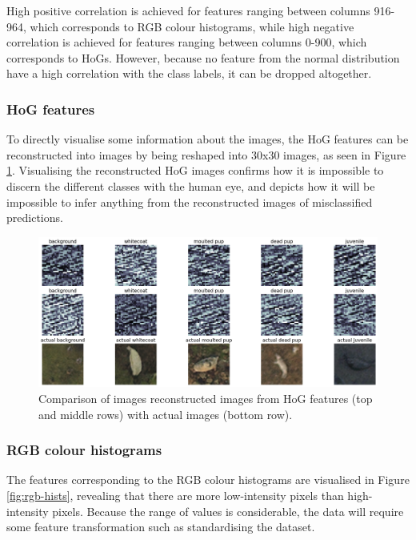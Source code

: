 \documentclass[letterpaper,12pt]{article}
\begin{document}
High positive correlation is achieved for features ranging between columns 916-964, which corresponds to RGB colour histograms, while high negative correlation is achieved for features ranging between columns 0-900, which corresponds to HoGs. However, because no feature from the normal distribution have a high correlation  with the class labels, it can be dropped altogether.

\subsubsection{HoG features}

To directly visualise some information about the images, the HoG features can be reconstructed into images by being reshaped into 30x30 images, as seen in Figure \ref{fig:hog_multi}. Visualising the reconstructed HoG images confirms how it is impossible to discern the different classes with the human eye, and depicts how it will be impossible to infer anything from the reconstructed images of misclassified predictions.

\begin{figure}[h]
\centerline{\includegraphics[width=\textwidth]{report/figures/hog_multi.png}}
\caption{\label{fig:hog_multi}Comparison of images reconstructed images from HoG features (top and middle rows) with actual images (bottom row).}
\end{figure}

\subsubsection{RGB colour histograms}

The features corresponding to the RGB colour histograms are visualised in Figure \ref{fig:rgb-hists}, revealing that there are more low-intensity pixels than high-intensity pixels. Because the range of values is considerable, the data will require some feature transformation such as standardising the dataset.
\end{document}

